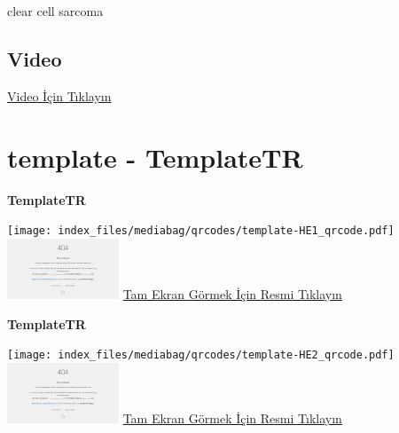 \documentclass[
  letterpaper,
  DIV=11,
  numbers=noendperiod]{scrreprt}
\begin{document}
\begin{tcolorbox}[enhanced jigsaw, breakable, opacitybacktitle=0.6, arc=.35mm, colbacktitle=quarto-callout-tip-color!10!white, colback=white, toptitle=1mm, left=2mm, opacityback=0, colframe=quarto-callout-tip-color-frame, titlerule=0mm, rightrule=.15mm, bottomrule=.15mm, toprule=.15mm, bottomtitle=1mm, title=\textcolor{quarto-callout-tip-color}{\faLightbulb}\hspace{0.5em}{Tanı}, coltitle=black, leftrule=.75mm]

clear cell sarcoma

\end{tcolorbox}

\hypertarget{video-18}{%
\subsection{Video}\label{video-18}}

\href{https://www.youtube.com/watch?v=SaNDCvKzQ6M}{Video İçin Tıklayın}

\hypertarget{sec-template}{%
\section{template - TemplateTR}\label{sec-template}}

\textbf{TemplateTR}

\texttt{[image: index\_files/mediabag/qrcodes/template-HE1\_qrcode.pdf]}
\href{https://images.patolojiatlasi.com/template/HE1.html}{\includegraphics[width=0.25\textwidth,height=\textheight]{./screenshots/thumbnail_template-HE1.png}}
\href{https://images.patolojiatlasi.com/template/HE1.html}{Tam Ekran
Görmek İçin Resmi Tıklayın}

\textbf{TemplateTR}

\texttt{[image: index\_files/mediabag/qrcodes/template-HE2\_qrcode.pdf]}
\href{https://images.patolojiatlasi.com/template/HE2.html}{\includegraphics[width=0.25\textwidth,height=\textheight]{./screenshots/thumbnail_template-HE2.png}}
\href{https://images.patolojiatlasi.com/template/HE2.html}{Tam Ekran
Görmek İçin Resmi Tıklayın}
\end{document}
